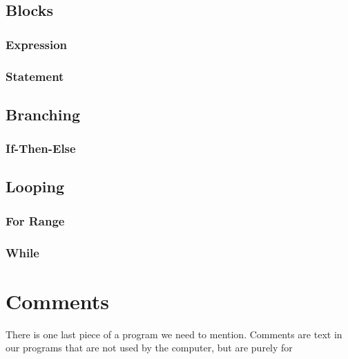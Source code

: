 \subsection{Blocks}

\subsubsection{Expression}

\subsubsection{Statement}

\subsection{Branching}

\subsubsection{If-Then-Else}


\subsection{Looping}

\subsubsection{For Range}

\subsubsection{While}

\section{Comments}

There is one last piece of a program we need to mention. Comments are text in
our programs that are not used by the computer, but are purely for

